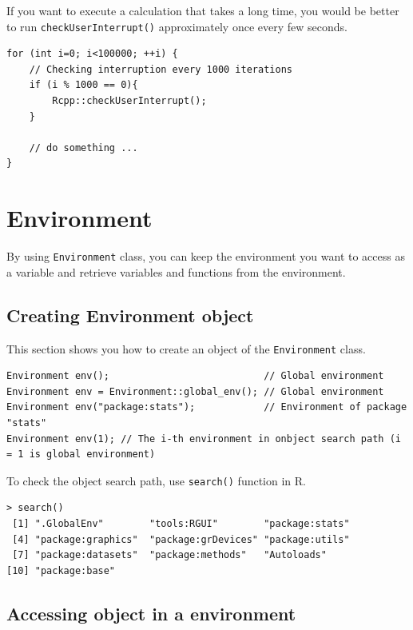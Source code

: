 \documentclass[]{book}
\begin{document}
If you want to execute a calculation that takes a long time, you would be better to run \texttt{checkUserInterrupt()} approximately once every few seconds.

\begin{verbatim}
for (int i=0; i<100000; ++i) {
    // Checking interruption every 1000 iterations
    if (i % 1000 == 0){
        Rcpp::checkUserInterrupt();
    }

    // do something ...
}
\end{verbatim}

\hypertarget{environment-1}{%
\chapter{Environment}\label{environment-1}}

By using \texttt{Environment} class, you can keep the environment you want to access as a variable and retrieve variables and functions from the environment.

\hypertarget{creating-environment-object}{%
\section{Creating Environment object}\label{creating-environment-object}}

This section shows you how to create an object of the \texttt{Environment} class.

\begin{verbatim}
Environment env();                           // Global environment
Environment env = Environment::global_env(); // Global environment
Environment env("package:stats");            // Environment of package "stats"
Environment env(1); // The i-th environment in onbject search path (i = 1 is global environment)
\end{verbatim}

To check the object search path, use \texttt{search()} function in R.

\begin{verbatim}
> search()
 [1] ".GlobalEnv"        "tools:RGUI"        "package:stats"    
 [4] "package:graphics"  "package:grDevices" "package:utils"    
 [7] "package:datasets"  "package:methods"   "Autoloads"        
[10] "package:base"   
\end{verbatim}

\hypertarget{accessing-object-in-a-environment}{%
\section{Accessing object in a environment}\label{accessing-object-in-a-environment}}
\end{document}
